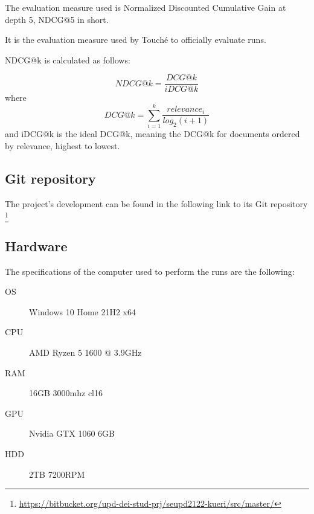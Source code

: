 	The evaluation measure used is Normalized Discounted Cumulative Gain at depth 5, NDCG@5 in short. \citep{jarvelin:2002}

	It is the evaluation measure used by Touché to officially evaluate runs.

	NDCG@k is calculated as follows:

	$$
	NDCG@k = \frac{DCG@k}{iDCG@k}
	$$
	where
	$$
	DCG@k = \sum_{i=1}^{k}\frac{relevance_i}{log_2(i+1)}
	$$
	and iDCG@k is the ideal DCG@k, meaning the DCG@k for documents ordered by relevance, highest to lowest.


\subsection{Git repository}

	The project’s development can be found in the following link to its Git repository  \footnote{\url{https://bitbucket.org/upd-dei-stud-prj/seupd2122-kueri/src/master/}}
	

\subsection{Hardware}

	The specifications of the computer used to perform the runs are the following:
	\begin{description}
		\item[OS] Windows 10 Home 21H2 x64
		\item[CPU] AMD Ryzen 5 1600 @ 3.9GHz
		\item[RAM] 16GB 3000mhz cl16
		\item[GPU] Nvidia GTX 1060 6GB
		\item[HDD] 2TB 7200RPM
	\end{description}